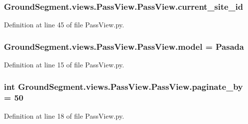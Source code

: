 \subsubsection[{current\+\_\+site\+\_\+id}]{\setlength{\rightskip}{0pt plus 5cm}Ground\+Segment.\+views.\+Pass\+View.\+Pass\+View.\+current\+\_\+site\+\_\+id}\label{class_ground_segment_1_1views_1_1_pass_view_1_1_pass_view_acd492b8aa45a0ec2d9b89691030737f9}


Definition at line 45 of file Pass\+View.\+py.

\hypertarget{class_ground_segment_1_1views_1_1_pass_view_1_1_pass_view_a385fffaf1dbe461207288bf6fc1f5c8b}{}
\subsubsection[{model}]{\setlength{\rightskip}{0pt plus 5cm}Ground\+Segment.\+views.\+Pass\+View.\+Pass\+View.\+model = {\bf Pasada}\hspace{0.3cm}{\ttfamily [static]}}\label{class_ground_segment_1_1views_1_1_pass_view_1_1_pass_view_a385fffaf1dbe461207288bf6fc1f5c8b}


Definition at line 15 of file Pass\+View.\+py.

\hypertarget{class_ground_segment_1_1views_1_1_pass_view_1_1_pass_view_a50ca718c5aebfea6d685baa2923ffb66}{}
\subsubsection[{paginate\+\_\+by}]{\setlength{\rightskip}{0pt plus 5cm}int Ground\+Segment.\+views.\+Pass\+View.\+Pass\+View.\+paginate\+\_\+by = 50\hspace{0.3cm}{\ttfamily [static]}}\label{class_ground_segment_1_1views_1_1_pass_view_1_1_pass_view_a50ca718c5aebfea6d685baa2923ffb66}


Definition at line 18 of file Pass\+View.\+py.

\hypertarget{class_ground_segment_1_1views_1_1_pass_view_1_1_pass_view_a639aabe3c613cfcc64dde52d282f1bac}{}
